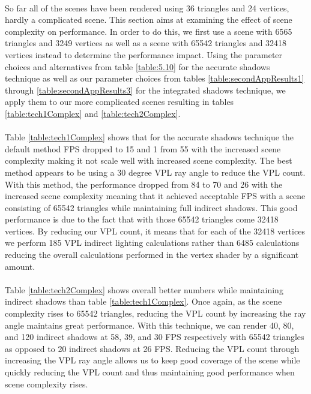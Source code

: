\paragraph{}
So far all of the scenes have been rendered using 36 triangles and 24 vertices, hardly a complicated scene.  This section aims at examining the effect of scene complexity on performance.  In order to do this, we first use a scene with 6565 triangles and 3249 vertices as well as a scene with 65542 triangles and 32418 vertices instead to determine the performance impact.  Using the parameter choices and alternatives from table \ref{table:5.10} for the accurate shadows technique as well as our parameter choices from tables \ref{table:secondAppResults1} through \ref{table:secondAppResults3} for the integrated shadows technique, we apply them to our more complicated scenes resulting in tables \ref{table:tech1Complex} and \ref{table:tech2Complex}.

\paragraph{}
Table \ref{table:tech1Complex} shows that for the accurate shadows technique the default method FPS dropped to 15 and 1 from 55 with the increased scene complexity making it not scale well with increased scene complexity.  The best method appears to be using a 30 degree VPL ray angle to reduce the VPL count.  With this method, the performance dropped from 84 to 70 and 26 with the increased scene complexity meaning that it achieved acceptable FPS with a scene consisting of 65542 triangles while maintaining full indirect shadows.  This good performance is due to the fact that with those 65542 triangles come 32418 vertices.  By reducing our VPL count, it means that for each of the 32418 vertices we perform 185 VPL indirect lighting calculations rather than 6485 calculations reducing the overall calculations performed in the vertex shader by a significant amount.

\paragraph{}
Table \ref{table:tech2Complex} shows overall better numbers while maintaining indirect shadows than table \ref{table:tech1Complex}.  Once again, as the scene complexity rises to 65542 triangles, reducing the VPL count by increasing the ray angle maintains great performance.  With this technique, we can render 40, 80, and 120 indirect shadows at 58, 39, and 30 FPS respectively with 65542 triangles as opposed to 20 indirect shadows at 26 FPS.  Reducing the VPL count through increasing the VPL ray angle allows us to keep good coverage of the scene while quickly reducing the VPL count and thus maintaining good performance when scene complexity rises.

